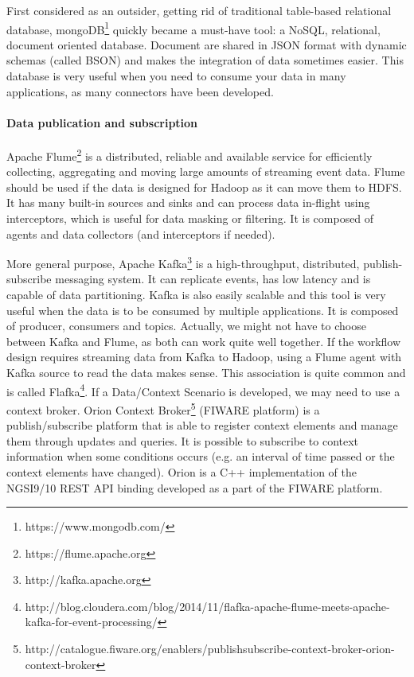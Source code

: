 First considered as an outsider, getting rid of traditional table-based relational database, mongoDB\footnote{https://www.mongodb.com/} quickly became a must-have tool: a NoSQL, relational, document oriented database.
Document are shared in JSON format with dynamic schemas (called BSON) and makes the integration of data sometimes easier.
This database is very useful when you need to consume your data in many applications, as many connectors have been developed.

\paragraph{Data publication and subscription}

Apache Flume\footnote{https://flume.apache.org} is a distributed, reliable and available service for efficiently collecting, aggregating and moving large amounts of streaming event data.
Flume should be used if the data is designed for Hadoop as it can move them to HDFS.
It has many built-in sources and sinks and can process data in-flight using interceptors, which is useful for data masking or filtering.
It is composed of agents and data collectors (and interceptors if needed).

More general purpose, Apache Kafka\footnote{http://kafka.apache.org} is a high-throughput, distributed, publish-subscribe messaging system.
It can replicate events, has low latency and is capable of data partitioning. Kafka is also easily scalable and this tool is very useful when the data is to be consumed by multiple applications. It is composed of producer, consumers and topics.
Actually, we might not have to choose between Kafka and Flume, as both can work quite well together.
If the workflow design requires streaming data from Kafka to Hadoop, using a Flume agent with Kafka source to read the data makes sense.
This association is quite common and is called Flafka\footnote{http://blog.cloudera.com/blog/2014/11/flafka-apache-flume-meets-apache-kafka-for-event-processing/}.
If a Data/Context Scenario is developed, we may need to use a context broker.
Orion Context Broker\footnote{http://catalogue.fiware.org/enablers/publishsubscribe-context-broker-orion-context-broker} (FIWARE platform) is a publish/subscribe platform that is able to register context elements and manage them through updates and queries.
It is possible to subscribe to context information when some conditions occurs (e.g. an interval of time passed or the context elements have changed).
Orion is a C++ implementation of the NGSI9/10 REST API binding developed as a part of the FIWARE platform.


